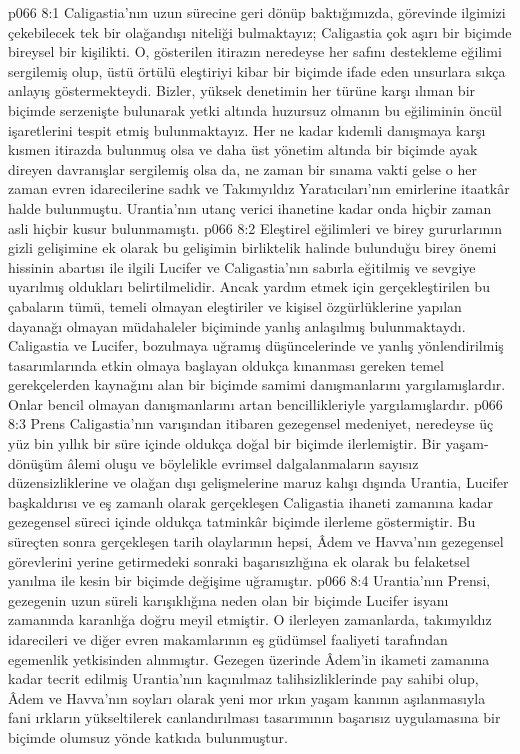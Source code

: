 \vs p066 8:1 Caligastia’nın uzun sürecine geri dönüp baktığımızda, görevinde ilgimizi çekebilecek tek bir olağandışı niteliği bulmaktayız; Caligastia çok aşırı bir biçimde bireysel bir kişilikti. O, gösterilen itirazın neredeyse her safını destekleme eğilimi sergilemiş olup, üstü örtülü eleştiriyi kibar bir biçimde ifade eden unsurlara sıkça anlayış göstermekteydi. Bizler, yüksek denetimin her türüne karşı ılıman bir biçimde serzenişte bulunarak yetki altında huzursuz olmanın bu eğiliminin öncül işaretlerini tespit etmiş bulunmaktayız. Her ne kadar kıdemli danışmaya karşı kısmen itirazda bulunmuş olsa ve daha üst yönetim altında bir biçimde ayak direyen davranışlar sergilemiş olsa da, ne zaman bir sınama vakti gelse o her zaman evren idarecilerine sadık ve Takımyıldız Yaratıcıları’nın emirlerine itaatkâr halde bulunmuştu. Urantia’nın utanç verici ihanetine kadar onda hiçbir zaman asli hiçbir kusur bulunmamıştı.
\vs p066 8:2 Eleştirel eğilimleri ve birey gururlarının gizli gelişimine ek olarak bu gelişimin birliktelik halinde bulunduğu birey önemi hissinin abartısı ile ilgili Lucifer ve Caligastia’nın sabırla eğitilmiş ve sevgiye uyarılmış oldukları belirtilmelidir. Ancak yardım etmek için gerçekleştirilen bu çabaların tümü, temeli olmayan eleştiriler ve kişisel özgürlüklerine yapılan dayanağı olmayan müdahaleler biçiminde yanlış anlaşılmış bulunmaktaydı. Caligastia ve Lucifer, bozulmaya uğramış düşüncelerinde ve yanlış yönlendirilmiş tasarımlarında etkin olmaya başlayan oldukça kınanması gereken temel gerekçelerden kaynağını alan bir biçimde samimi danışmanlarını yargılamışlardır. Onlar bencil olmayan danışmanlarını artan bencillikleriyle yargılamışlardır.
\vs p066 8:3 Prens Caligastia’nın varışından itibaren gezegensel medeniyet, neredeyse üç yüz bin yıllık bir süre içinde oldukça doğal bir biçimde ilerlemiştir. Bir yaşam\hyp{}dönüşüm âlemi oluşu ve böylelikle evrimsel dalgalanmaların sayısız düzensizliklerine ve olağan dışı gelişmelerine maruz kalışı dışında Urantia, Lucifer başkaldırısı ve eş zamanlı olarak gerçekleşen Caligastia ihaneti zamanına kadar gezegensel süreci içinde oldukça tatminkâr biçimde ilerleme göstermiştir. Bu süreçten sonra gerçekleşen tarih olaylarının hepsi, Âdem ve Havva’nın gezegensel görevlerini yerine getirmedeki sonraki başarısızlığına ek olarak bu felaketsel yanılma ile kesin bir biçimde değişime uğramıştır.
\vs p066 8:4 Urantia’nın Prensi, gezegenin uzun süreli karışıklığına neden olan bir biçimde Lucifer isyanı zamanında karanlığa doğru meyil etmiştir. O ilerleyen zamanlarda, takımyıldız idarecileri ve diğer evren makamlarının eş güdümsel faaliyeti tarafından egemenlik yetkisinden alınmıştır. Gezegen üzerinde Âdem’in ikameti zamanına kadar tecrit edilmiş Urantia’nın kaçınılmaz talihsizliklerinde pay sahibi olup, Âdem ve Havva’nın soyları olarak yeni mor ırkın yaşam kanının aşılanmasıyla fani ırkların yükseltilerek canlandırılması tasarımının başarısız uygulamasına bir biçimde olumsuz yönde katkıda bulunmuştur.
